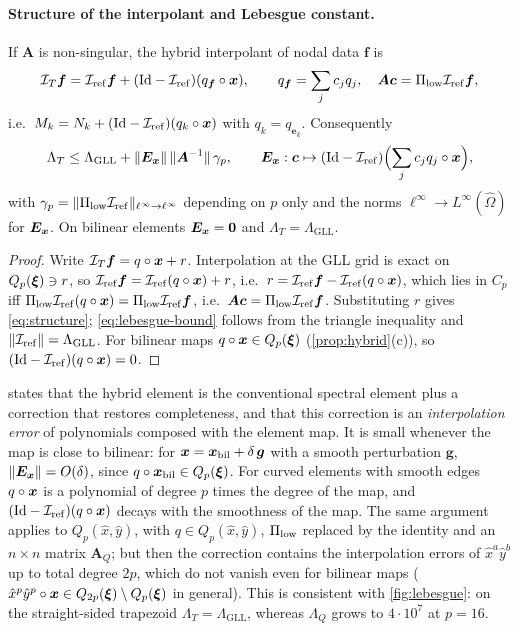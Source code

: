 \paragraph{Structure of the interpolant and Lebesgue constant.}
\begin{proposition}\label{prop:structure}
If $\bm A$ is non-singular, the hybrid interpolant of nodal data $\bm f$ is
\begin{equation}
  \mathcal I_T\bm f=\mathcal{I}_{\mathrm{ref}}\bm f+(\mathrm{Id}-\mathcal{I}_{\mathrm{ref}})(q_{\bm f}\circ\bm{x}),\qquad
  q_{\bm f}=\sum_jc_jq_j,\quad \bm A\bm c=\Pi_{\mathrm{low}}\mathcal{I}_{\mathrm{ref}}\bm f ,
  \label{eq:structure}
\end{equation}
i.e.\ $M_k=N_k+(\mathrm{Id}-\mathcal{I}_{\mathrm{ref}})(q_k\circ\bm{x})$ with $q_k=q_{\bm e_k}$. Consequently
\begin{equation}
  \Lambda_T\le\Lambda_{\mathrm{GLL}}+\|\bm E_{\bm{x}}\|\,\|\bm A^{-1}\|\,\gamma_p ,
  \qquad \bm E_{\bm{x}}:\bm c\mapsto(\mathrm{Id}-\mathcal{I}_{\mathrm{ref}})\Bigl(\sum_jc_jq_j\circ\bm{x}\Bigr),
  \label{eq:lebesgue-bound}
\end{equation}
with $\gamma_p=\|\Pi_{\mathrm{low}}\mathcal{I}_{\mathrm{ref}}\|_{\ell^\infty\to\ell^\infty}$ depending on $p$ only and the norms
$\ell^\infty\to L^\infty(\hat\Omega)$ for $\bm E_{\bm{x}}$. On bilinear elements $\bm
E_{\bm{x}}=\bm0$ and $\Lambda_T=\Lambda_{\mathrm{GLL}}$.
\end{proposition}
\begin{proof}
Write $\mathcal I_T\bm f=q\circ\bm{x}+r$. Interpolation at the GLL grid is exact on $Q_p(\bm{\xi})\ni
r$, so $\mathcal{I}_{\mathrm{ref}}\bm f=\mathcal{I}_{\mathrm{ref}}(q\circ\bm{x})+r$, i.e.\ $r=\mathcal{I}_{\mathrm{ref}}\bm f-\mathcal{I}_{\mathrm{ref}}(q\circ\bm{x})$, which lies in $C_p$
iff $\Pi_{\mathrm{low}}\mathcal{I}_{\mathrm{ref}}(q\circ\bm{x})=\Pi_{\mathrm{low}}\mathcal{I}_{\mathrm{ref}}\bm f$, i.e.\ $\bm A\bm c=\Pi_{\mathrm{low}}\mathcal{I}_{\mathrm{ref}}\bm f$. Substituting $r$ gives
\eqref{eq:structure}; \eqref{eq:lebesgue-bound} follows from the triangle inequality and
$\|\mathcal{I}_{\mathrm{ref}}\|=\Lambda_{\mathrm{GLL}}$. For bilinear maps $q\circ\bm{x}\in Q_p(\bm{\xi})$
(\cref{prop:hybrid}(c)), so $(\mathrm{Id}-\mathcal{I}_{\mathrm{ref}})(q\circ\bm{x})=0$.
\end{proof}
 states that the hybrid element is the conventional spectral element
plus a correction that restores completeness, and that this correction is an
\emph{interpolation error} of polynomials composed with the element map. It is small whenever
the map is close to bilinear: for $\bm{x}=\bm{x}_{\mathrm{bil}}+\delta\,\bm g$ with a smooth
perturbation $\bm g$, $\|\bm E_{\bm{x}}\|=O(\delta)$, since $q\circ\bm{x}_{\mathrm{bil}}\in
Q_p(\bm{\xi})$. For curved elements with smooth edges $q\circ\bm{x}$ is a polynomial of degree $p$
times the degree of the map, and $(\mathrm{Id}-\mathcal{I}_{\mathrm{ref}})(q\circ\bm{x})$ decays with the smoothness of
the map. The same argument applies to $Q_p(\hat x,\hat y)$, with $q\in Q_p(\hat x,\hat y)$, $\Pi_{\mathrm{low}}$
replaced by the identity and an $n\times n$ matrix $\bm A_Q$; but then the correction contains the
interpolation errors of $\hat x^a\hat y^b$ up to total degree $2p$, which do not vanish even for
bilinear maps ($\hat x^p\hat y^p\circ\bm{x}\in Q_{2p}(\bm{\xi})\setminus Q_p(\bm{\xi})$ in general). This is
consistent with \cref{fig:lebesgue}: on the straight-sided trapezoid $\Lambda_T=\Lambda_{\mathrm{GLL}}$,
whereas $\Lambda_Q$ grows to $4\cdot10^7$ at $p=16$.

